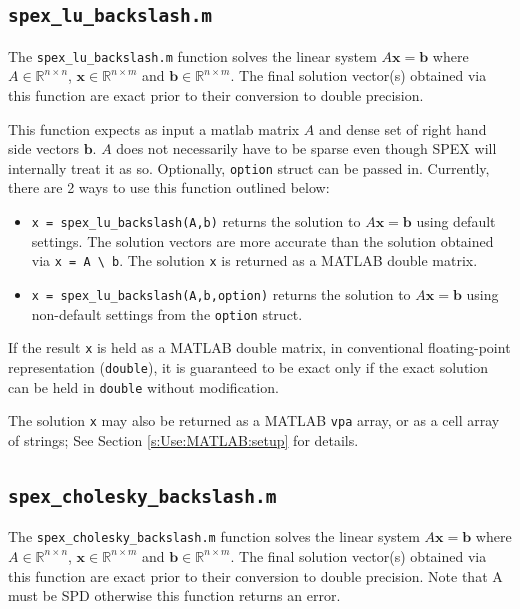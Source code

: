 \documentclass[12pt,oneside]{book}
\theoremstyle{definition}
\renewcommand{\b}{\mathbf{b}}
\newcommand{\x}{\mathbf{x}}
\begin{document}
\subsection{\texttt{spex\_lu\_backslash.m}}
The \verb|spex_lu_backslash.m| function solves the linear system $A \x = \b$ where
$A \in \mathbb{R}^{n \times n}$, $\x \in \mathbb{R}^{n \times m}$ and $\b \in
\mathbb{R}^{n \times m}$. The final solution vector(s) obtained via this
function are exact prior to their conversion to double precision.

This function expects as input a matlab matrix $A$ and dense set of
right hand side vectors $\b$. $A$ does not necessarily have to be sparse
even though SPEX will internally treat it as so. Optionally, \verb|option| 
struct can be passed in.
Currently, there are 2 ways to use this function outlined below:

\begin{itemize}

\item \verb|x = spex_lu_backslash(A,b)| returns the solution to $A \x =
\b$ using default settings. The solution vectors are more accurate than
the solution obtained via \verb|x = A \ b|.  The solution \verb|x| is
returned as a MATLAB double matrix.

\item \verb|x = spex_lu_backslash(A,b,option)| returns the solution to $A \x =
\b$ using non-default settings from the \verb|option| struct.

\end{itemize}

If the result \verb|x| is held as a MATLAB double matrix, in conventional
floating-point representation (\verb|double|), it is guaranteed to be exact
only if the exact solution can be held in \verb|double| without modification.

The solution \verb|x| may also be returned as a MATLAB \verb|vpa| array, or as
a cell array of strings; See Section \ref{s:Use:MATLAB:setup} for details.


\subsection{\texttt{spex\_cholesky\_backslash.m}}
The \verb|spex_cholesky_backslash.m| function solves the linear system $A \x = \b$ where
$A \in \mathbb{R}^{n \times n}$, $\x \in \mathbb{R}^{n \times m}$ and $\b \in
\mathbb{R}^{n \times m}$. The final solution vector(s) obtained via this
function are exact prior to their conversion to double precision. Note that
A must be SPD otherwise this function returns an error.
\end{document}
